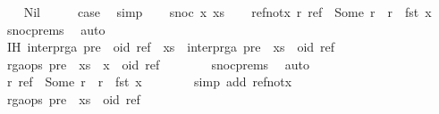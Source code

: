 \begin{isabellebody}
\ \ \isamarkupfalse%
\ Nil\isanewline
\ \ \isamarkupfalse%
\ \isamarkupfalse%
\ {\isacharquery}case\ \isamarkupfalse%
\ simp\isanewline
{}\isamarkupfalse%
\isanewline
\ \ \isamarkupfalse%
\ {\isacharparenleft}snoc\ x\ xs{\isacharparenright}\isanewline
\ \ \isamarkupfalse%
\ ref{\isacharunderscore}not{\isacharunderscore}x{\isacharcolon}\ {\isachardoublequoteopen}{\isasymAnd}r{\isachardot}\ ref\ {\isacharequal}\ Some\ r\ {\isasymLongrightarrow}\ r\ {\isasymnoteq}\ fst\ x{\isachardoublequoteclose}\ \isamarkupfalse%
\ snoc{\isachardot}prems{\isacharparenleft}{}{\isacharparenright}\ \isamarkupfalse%
\ auto\isanewline
\ \ \isamarkupfalse%
\ IH{\isacharcolon}\ {\isachardoublequoteopen}interp{\isacharunderscore}rga\ {\isacharparenleft}pre\ {\isacharat}\ {\isacharparenleft}oid{\isacharcomma}\ ref{\isacharparenright}\ {\isacharhash}\ xs{\isacharparenright}\ {\isacharequal}\ interp{\isacharunderscore}rga\ {\isacharparenleft}pre\ {\isacharat}\ xs\ {\isacharat}\ {\isacharbrackleft}{\isacharparenleft}oid{\isacharcomma}\ ref{\isacharparenright}{\isacharbrackright}{\isacharparenright}{\isachardoublequoteclose}\isanewline
\ \ \isamarkupfalse%
\ {\isacharminus}\isanewline
\ \ \ \ \isamarkupfalse%
\ {\isachardoublequoteopen}rga{\isacharunderscore}ops\ {\isacharparenleft}{\isacharparenleft}pre\ {\isacharat}\ xs{\isacharparenright}\ {\isacharat}\ {\isacharbrackleft}x{\isacharbrackright}\ {\isacharat}\ {\isacharbrackleft}{\isacharparenleft}oid{\isacharcomma}\ ref{\isacharparenright}{\isacharbrackright}{\isacharparenright}{\isachardoublequoteclose}\isanewline
\ \ \ \ \ \ \isamarkupfalse%
\ snoc{\isachardot}prems{\isacharparenleft}{}{\isacharparenright}\ \isamarkupfalse%
\ auto\isanewline
\ \ \ \ \isamarkupfalse%
\ \isamarkupfalse%
\ {\isachardoublequoteopen}{\isasymAnd}r{\isachardot}\ ref\ {\isacharequal}\ Some\ r\ {\isasymLongrightarrow}\ r\ {\isasymnoteq}\ fst\ x{\isachardoublequoteclose}\isanewline
\ \ \ \ \ \ \isamarkupfalse%
\ {\isacharparenleft}simp\ add{\isacharcolon}\ ref{\isacharunderscore}not{\isacharunderscore}x{\isacharparenright}\isanewline
\ \ \ \ \isamarkupfalse%
\ \isamarkupfalse%
\ {\isachardoublequoteopen}rga{\isacharunderscore}ops\ {\isacharparenleft}{\isacharparenleft}pre\ {\isacharat}\ xs{\isacharparenright}\ {\isacharat}\ {\isacharbrackleft}{\isacharparenleft}oid{\isacharcomma}\ ref{\isacharparenright}{\isacharbrackright}{\isacharparenright}{\isachardoublequoteclose}\isanewline

\end{isabellebody}

